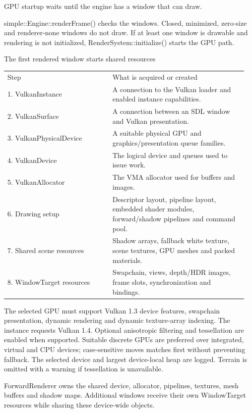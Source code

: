 \documentclass[11pt,a4paper]{article}
\begin{document}
\label{core-33}
GPU startup waits until the engine has a window that can draw.

simple::Engine::renderFrame() checks the windows. Closed, minimized, zero-size and renderer-none windows do not draw. If at least one window is drawable and rendering is not initialized, RenderSystem::initialize() starts the GPU path.

The first rendered window starts shared resources

{\small
\begin{longtable}{@{}p{0.42\linewidth}p{0.54\linewidth}@{}}
Step & What is acquired or created \\
1. VulkanInstance & A connection to the Vulkan loader and enabled instance capabilities. \\
2. VulkanSurface & A connection between an SDL window and Vulkan presentation. \\
3. VulkanPhysicalDevice & A suitable physical GPU and graphics/presentation queue families. \\
4. VulkanDevice & The logical device and queues used to issue work. \\
5. VulkanAllocator & The VMA allocator used for buffers and images. \\
6. Drawing setup & Descriptor layout, pipeline layout, embedded shader modules, forward/shadow pipelines and command pool. \\
7. Shared scene resources & Shadow arrays, fallback white texture, scene textures, GPU meshes and packed materials. \\
8. WindowTarget resources & Swapchain, views, depth/HDR images, frame slots, synchronization and bindings. \\
\end{longtable}
}

The selected GPU must support Vulkan 1.3 device features, swapchain presentation, dynamic rendering and dynamic texture-array indexing. The instance requests Vulkan 1.4. Optional anisotropic filtering and tessellation are enabled when supported. Suitable discrete GPUs are preferred over integrated, virtual and CPU devices; case-sensitive  moves matches first without preventing fallback. The selected device and largest device-local heap are logged. Terrain is omitted with a warning if tessellation is unavailable.

ForwardRenderer owns the shared device, allocator, pipelines, textures, mesh buffers and shadow maps. Additional windows receive their own WindowTarget resources while sharing these device-wide objects.
\end{document}
